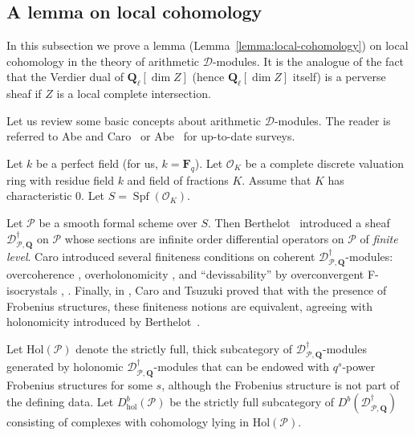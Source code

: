 \documentclass{amsart}
\numberwithin{equation}{section}
\theoremstyle{plain}
\theoremstyle{definition}
\renewcommand{\mathbb}{\mathbf}
\begin{document}
\subsection*{A lemma on local cohomology}
In this subsection we prove a lemma
(Lemma~\ref{lemma:local-cohomology}) on local cohomology in the theory
of arithmetic \(\mathscr{D}\)-modules.  It is the analogue of the fact
that the Verdier dual of \(\mathbb{Q}_{\ell}[\dim Z]\) (hence
\(\mathbb{Q}_{\ell}[\dim Z]\) itself) is a perverse sheaf if \(Z\) is
a local complete intersection.

\medskip%
Let us review some basic concepts about arithmetic
\(\mathscr{D}\)-modules.  The reader is referred to Abe and
Caro~\cite[\S1]{abe-caro:theory-of-weights-in-p-adic-cohomology} or
Abe~\cite[\S1]{abe:langlands-correspondence-for-isocrystals-and-crystalline-companions}
for up-to-date surveys.

\medskip%
Let \(k\) be a perfect field (for us, \(k = \mathbb{F}_{q}\)).  Let
\(\mathcal{O}_{K}\) be a complete discrete valuation ring with residue
field \(k\) and field of fractions \(K\).  Assume that \(K\) has
characteristic \(0\).  Let
\(S = \operatorname{Spf}(\mathcal{O}_{K})\).


\medskip%
Let \(\mathcal{P}\) be a smooth formal scheme over \(S\).  Then
Berthelot~\cite[\S2.4]{berthelot:arithmetic-d-modules-1-differential-operators-of-finite-level}
introduced a sheaf \(\mathscr{D}^{\dagger}_{\mathcal{P},\mathbb{Q}}\)
on \(\mathcal{P}\) whose sections are infinite order differential
operators on \(\mathcal{P}\) of \emph{finite level}.  Caro introduced
several finiteness conditions on coherent
\(\mathscr{D}^{\dagger}_{\mathcal{P},\mathbb{Q}}\)-modules:
overcoherence
\cite[Définition~3.1.1]{caro:overcoherent-arithmetic-d-modules},
overholonomicity
\cite[Définition~3.1]{caro:overholonomic-arithmetic-d-modules}, and
``devissability'' by overconvergent F-isocrystals
\cite[Définition~3.2.5]{caro:overconvergent-f-isocrystals-and-differential-overcoherence},
\cite[Definition~2.3.1]{caro-tsuzuki:overholonomicity-of-overconvergent-f-isocrystals}.
Finally, in
\cite[Theorem~2.3.16]{caro-tsuzuki:overholonomicity-of-overconvergent-f-isocrystals},
Caro and Tsuzuki proved that with the presence of Frobenius
structures, these finiteness notions are equivalent, agreeing with
holonomicity introduced by Berthelot~\cite[\S3]{berthelot:introduction-to-arithmetic-d-modules}.

\medskip%
Let \(\mathrm{Hol}(\mathcal{P})\) denote the strictly full, thick
subcategory of
\(\mathscr{D}^{\dagger}_{\mathcal{P},\mathbb{Q}}\)-modules generated
by holonomic
\(\mathscr{D}^{\dagger}_{\mathcal{P},\mathbb{Q}}\)-modules that can be
endowed with \(q^{s}\)-power Frobenius structures for some \(s\),
although the Frobenius structure is not part of the defining data.
Let \(D^{b}_{\mathrm{hol}}(\mathcal{P})\) be the strictly full
subcategory of
\(D^{b}(\mathscr{D}^{\dagger}_{\mathcal{P},\mathbb{Q}})\) consisting
of complexes with cohomology lying in \(\mathrm{Hol}(\mathcal{P})\).
\end{document}
